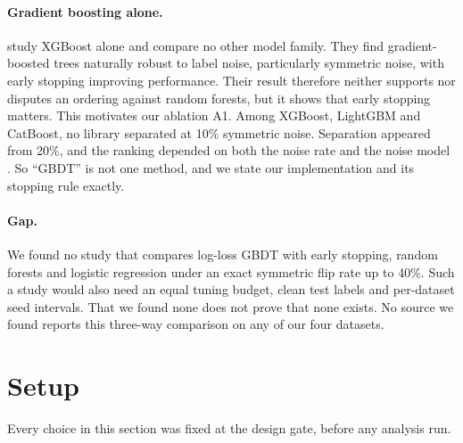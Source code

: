 \documentclass[11pt]{article}
\begin{document}
\paragraph{Gradient boosting alone.} \citet{eisenburger2024} study XGBoost alone and compare
no other model family. They find gradient-boosted trees naturally robust to label noise,
particularly symmetric noise, with early stopping improving performance. Their result
therefore neither supports nor disputes an ordering against random forests, but it shows
that early stopping matters. This motivates our ablation A1. Among XGBoost, LightGBM and
CatBoost, no library separated at 10\% symmetric noise. Separation appeared from 20\%, and
the ranking depended on both the noise rate and the noise model \citep{morampudi2026}. So
``GBDT'' is not one method, and we state our implementation and its stopping rule exactly.

\paragraph{Gap.} We found no study that compares log-loss GBDT with early stopping, random
forests and logistic regression under an exact symmetric flip rate up to 40\%. Such a study
would also need an equal tuning budget, clean test labels and per-dataset seed intervals.
That we found none does not prove that none exists. No source we found reports this
three-way comparison on any of our four datasets.

\section{Setup}
\label{sec:setup}

Every choice in this section was fixed at the design gate, before any analysis run.
\end{document}

